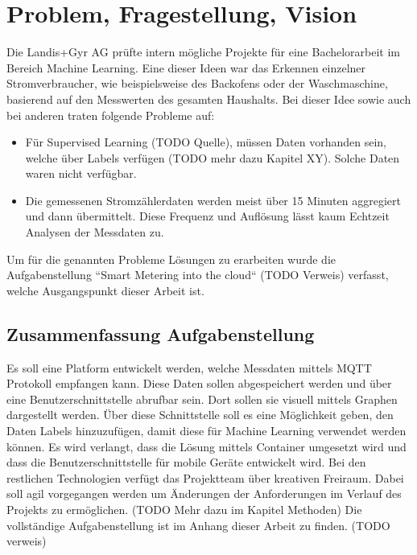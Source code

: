 \chapter{Problem, Fragestellung, Vision}

Die Landis+Gyr AG prüfte intern mögliche Projekte für eine Bachelorarbeit im Bereich Machine Learning.
Eine dieser Ideen war das Erkennen einzelner Stromverbraucher, wie beispielsweise des Backofens oder der Waschmaschine,
basierend auf den Messwerten des gesamten Haushalts.
Bei dieser Idee sowie auch bei anderen traten folgende Probleme auf:
\begin{itemize}
    \item Für Supervised Learning (TODO Quelle), müssen Daten vorhanden sein,
          welche über Labels verfügen (TODO mehr dazu Kapitel XY).
          Solche Daten waren nicht verfügbar.
    \item Die gemessenen Stromzählerdaten werden meist über 15 Minuten aggregiert und dann übermittelt.
          Diese Frequenz und Auflösung lässt kaum Echtzeit Analysen der Messdaten zu.

\end{itemize}

Um für die genannten Probleme Lösungen zu erarbeiten wurde die Aufgabenstellung ``Smart Metering into the cloud`` (TODO Verweis) verfasst,
welche Ausgangspunkt dieser Arbeit ist.

\section{Zusammenfassung Aufgabenstellung}
\label{aufgabenstellung}

Es soll eine Platform entwickelt werden, welche Messdaten mittels \ac{MQTT} Protokoll  empfangen kann.
Diese Daten sollen abgespeichert werden und über eine Benutzerschnittstelle abrufbar sein. Dort sollen sie visuell mittels Graphen dargestellt werden.
Über diese Schnittstelle soll es eine Möglichkeit geben, den Daten Labels hinzuzufügen, damit diese für Machine Learning verwendet werden können.
Es wird verlangt, dass die Lösung mittels Container umgesetzt wird und dass die Benutzerschnittstelle für mobile Geräte entwickelt wird.
Bei den restlichen Technologien verfügt das Projektteam über kreativen Freiraum. %
Dabei soll agil vorgegangen werden um Änderungen der Anforderungen im Verlauf des Projekts zu ermöglichen. (TODO Mehr dazu im Kapitel Methoden)
Die vollständige Aufgabenstellung ist im Anhang dieser Arbeit zu finden. (TODO verweis)

